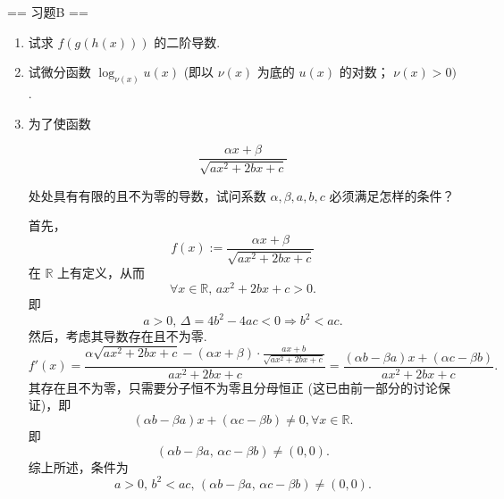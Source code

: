 == 习题B ==

\begin{enumerate}
    \item[1.]试求 $\displaystyle f(g(h(x)))$ 的二阶导数.
    \item[2.]试微分函数 $\displaystyle \log_{\nu (x)}u(x)$ (即以 $\nu (x)$ 为底的 $u(x)$ 的对数； $\nu (x) > 0)$.
    \item[3.]为了使函数

    \[\displaystyle \frac{\alpha x + \beta}{\sqrt{ax^2+2bx+c}}\]

    处处具有有限的且不为零的导数，试问系数 $\displaystyle \alpha ,\beta ,a,b,c$ 必须满足怎样的条件？
    \begin{solution}
        首先，
        \[
        f(x):=\frac{\alpha x+\beta}{\sqrt{ax^2+2bx+c}}
        \]
        在 $\mathbb{R}$ 上有定义，从而
        \[
        \forall x\in\mathbb{R},\,ax^2+2bx+c>0.
        \]
        即
        \[
        a>0,\,\Delta=4b^2-4ac<0\Rightarrow b^2<ac.
        \]
        然后，考虑其导数存在且不为零.\\
        \[
        f'(x)=\frac{\alpha\sqrt{ax^2+2bx+c}-(\alpha x+\beta)\cdot\frac{ax+b}{\sqrt{ax^2+2bx+c}}}{ax^2+2bx+c}
        =\frac{(\alpha b-\beta a)x+(\alpha c-\beta b)}{ax^2+2bx+c}.
        \]
        其存在且不为零，只需要分子恒不为零且分母恒正 (这已由前一部分的讨论保证)，即
        \[
        (\alpha b-\beta a)x+(\alpha c-\beta b)\neq 0,\forall x\in\mathbb{R}.
        \]
        即
        \[
        (\alpha b-\beta a,\,\alpha c-\beta b)\neq(0,0).
        \]
        综上所述，条件为
        \[
        a>0,\,b^2<ac,\,(\alpha b-\beta a,\,\alpha c-\beta b)\neq(0,0).
        \]
    \end{solution}


\end{enumerate}
